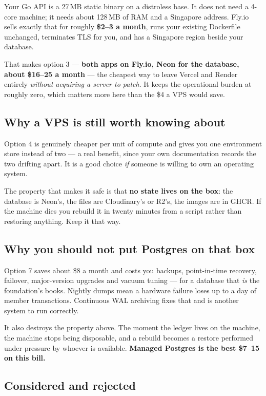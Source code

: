 \documentclass[11pt,a4paper]{article}
\begin{document}
Your Go API is a 27\,MB static binary on a distroless base. It does not need a 4-core machine; it needs about 128\,MB of RAM and a Singapore address. Fly.io sells exactly that for roughly \textbf{\$2--3 a month}, runs your existing Dockerfile unchanged, terminates TLS for you, and has a Singapore region beside your database.

That makes option 3 --- \textbf{both apps on Fly.io, Neon for the database, about \$16--25 a month} --- the cheapest way to leave Vercel and Render entirely \emph{without acquiring a server to patch}. It keeps the operational burden at roughly zero, which matters more here than the \$4 a VPS would save.

\subsection{Why a VPS is still worth knowing about}

Option 4 is genuinely cheaper per unit of compute and gives you one environment store instead of two --- a real benefit, since your own documentation records the two drifting apart. It is a good choice \emph{if} someone is willing to own an operating system.

The property that makes it safe is that \textbf{no state lives on the box}: the database is Neon's, the files are Cloudinary's or R2's, the images are in GHCR. If the machine dies you rebuild it in twenty minutes from a script rather than restoring anything. Keep it that way.

\subsection{Why you should not put Postgres on that box}

Option 7 saves about \$8 a month and costs you backups, point-in-time recovery, failover, major-version upgrades and vacuum tuning --- for a database that \emph{is} the foundation's books. Nightly dumps mean a hardware failure loses up to a day of member transactions. Continuous WAL archiving fixes that and is another system to run correctly.

It also destroys the property above. The moment the ledger lives on the machine, the machine stops being disposable, and a rebuild becomes a restore performed under pressure by whoever is available. \textbf{Managed Postgres is the best \$7--15 on this bill.}

\subsection{Considered and rejected}
\end{document}
